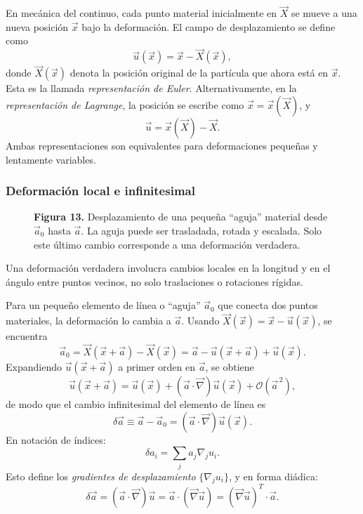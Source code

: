 En mecánica del continuo, cada punto material inicialmente en $\vec{X}$ se mueve a una nueva posición $\vec{x}$ bajo la deformación. El campo de desplazamiento se define como
\[ \vec{u}(\vec{x}) = \vec{x} - \vec{X}(\vec{x}), \tag{84} \]
donde $\vec{X}(\vec{x})$ denota la posición original de la partícula que ahora está en $\vec{x}$. Esta es la llamada \emph{representación de Euler}. Alternativamente, en la \emph{representación de Lagrange}, la posición se escribe como $\vec{x} = \vec{x}(\vec{X})$, y
\[ \vec{u} = \vec{x}(\vec{X}) - \vec{X}. \tag{85} \]
Ambas representaciones son equivalentes para deformaciones pequeñas y lentamente variables.

\subsubsection{Deformación local e infinitesimal}

\begin{figure}[H]
\centering

\par\medskip
\textbf{Figura 13.} Desplazamiento de una pequeña ``aguja'' material desde $\vec{a}_0$ hasta $\vec{a}$. La aguja puede ser trasladada, rotada y escalada. Solo este último cambio corresponde a una deformación verdadera.
\end{figure}

Una deformación verdadera involucra cambios locales en la longitud y en el ángulo entre puntos vecinos, no solo traslaciones o rotaciones rígidas.

Para un pequeño elemento de línea o ``aguja'' $\vec{a}_0$ que conecta dos puntos materiales, la deformación lo cambia a $\vec{a}$. Usando $\vec{X}(\vec{x}) = \vec{x} - \vec{u}(\vec{x})$, se encuentra
\[ \vec{a}_0 = \vec{X}(\vec{x} + \vec{a}) - \vec{X}(\vec{x}) = \vec{a} - \vec{u}(\vec{x} + \vec{a}) + \vec{u}(\vec{x}). \tag{86} \]
Expandiendo $\vec{u}(\vec{x} + \vec{a})$ a primer orden en $\vec{a}$, se obtiene
\[ \vec{u}(\vec{x} + \vec{a}) = \vec{u}(\vec{x}) + (\vec{a}\cdot\vec{\nabla})\vec{u}(\vec{x}) + \mathcal{O}(\vec{a}^{\,2}), \tag{87} \]
de modo que el cambio infinitesimal del elemento de línea es
\[ \delta\vec{a} \equiv \vec{a} - \vec{a}_0 = (\vec{a}\cdot\vec{\nabla})\vec{u}(\vec{x}). \tag{88} \]
En notación de índices:
\[ \delta a_i = \sum_j a_j \nabla_j u_i. \tag{89} \]
Esto define los \emph{gradientes de desplazamiento} $\{\nabla_j u_i\}$, y en forma diádica:
\[ \delta\vec{a} = (\vec{a}\cdot\vec{\nabla})\vec{u} = \vec{a}\cdot(\vec{\nabla}\vec{u}) = (\vec{\nabla}\vec{u})^{T}\cdot\vec{a}. \tag{90} \]

